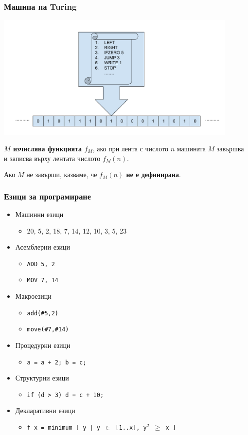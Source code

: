 \documentclass{beamer}
\begin{document}
\begin{frame}
  \frametitle{Машина на Turing}

  \includegraphics[width=0.9\textwidth]{images/turing.pdf}

  \pause
  \textbf{$M$ изчислява функцията $f_M$}, ако при лента с числото $n$ машината $M$ завършва и записва върху лентата числото $f_M(n)$.

  \pause
  Ако $M$ не завърши, казваме, че \textbf{$f_M(n)$ не е дефинирана}.
\end{frame}

\begin{frame}
  \frametitle{Езици за програмиране}
  \begin{itemize}[<+->]
  \item Машинни езици
    \begin{itemize}
    \item 20, 5, 2, 18, 7, 14, 12, 10, 3, 5, 23
    \end{itemize}
  \item Асемблерни езици
    \begin{itemize}
    \item \tt{ADD 5, 2}
    \item \tt{MOV 7, 14}
    \end{itemize}
  \item Макроезици
    \begin{itemize}
    \item \tt{add(\#5,2)}
    \item \tt{move(\#7,\#14)}
    \end{itemize}
  \item Процедурни езици
    \begin{itemize}
    \item \tt{a = a + 2; b = c;}
    \end{itemize}
  \item Структурни езици
    \begin{itemize}
    \item \tt{if (d > 3) d = c + 10;}
    \end{itemize}
  \item Декларативни езици
    \begin{itemize}
    \item \tt{f x = minimum [ y | y $\in$ [1..x], y${^2}$ $\geq$ x ]}
    \end{itemize}
  \end{itemize}
\end{frame}
\end{document}
